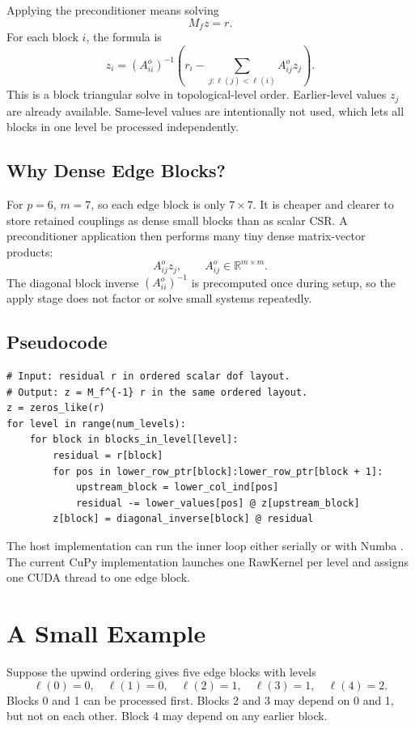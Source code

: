 \documentclass[11pt]{article}
\newcommand{\code}[1]{\texttt{\detokenize{#1}}}
\newcommand{\R}{\mathbb{R}}
\newcommand{\level}{\ell}
\begin{document}
Applying the preconditioner means solving
\[
  M_f z = r.
\]
For each block \(i\), the formula is
\[
  z_i = \left(A^o_{ii}\right)^{-1}
  \left(
    r_i - \sum_{j:\level(j)<\level(i)} A^o_{ij} z_j
  \right).
\]
This is a block triangular solve in topological-level order.  Earlier-level
values \(z_j\) are already available.  Same-level values are intentionally not
used, which lets all blocks in one level be processed independently.

\subsection{Why Dense Edge Blocks?}

For \(p=6\), \(m=7\), so each edge block is only \(7\times 7\).  It is cheaper
and clearer to store retained couplings as dense small blocks than as scalar
CSR.  A preconditioner application then performs many tiny dense matrix-vector
products:
\[
  A^o_{ij} z_j, \qquad A^o_{ij}\in\R^{m\times m}.
\]
The diagonal block inverse \((A^o_{ii})^{-1}\) is precomputed once during
setup, so the apply stage does not factor or solve small systems repeatedly.

\subsection{Pseudocode}

\begin{lstlisting}
# Input: residual r in ordered scalar dof layout.
# Output: z = M_f^{-1} r in the same ordered layout.
z = zeros_like(r)
for level in range(num_levels):
    for block in blocks_in_level[level]:
        residual = r[block]
        for pos in lower_row_ptr[block]:lower_row_ptr[block + 1]:
            upstream_block = lower_col_ind[pos]
            residual -= lower_values[pos] @ z[upstream_block]
        z[block] = diagonal_inverse[block] @ residual
\end{lstlisting}

The host implementation can run the inner loop either serially or with Numba
\code{prange}.  The current CuPy implementation launches one RawKernel per
level and assigns one CUDA thread to one edge block.

\section{A Small Example}
\label{sec:small-example}

Suppose the upwind ordering gives five edge blocks with levels
\[
  \level(0)=0,\quad \level(1)=0,\quad
  \level(2)=1,\quad \level(3)=1,\quad \level(4)=2.
\]
Blocks 0 and 1 can be processed first.  Blocks 2 and 3 may depend on 0 and 1,
but not on each other.  Block 4 may depend on any earlier block.
\end{document}
